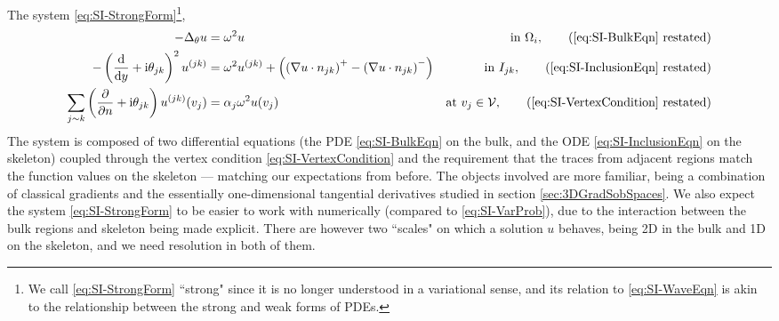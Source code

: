 The system \eqref{eq:SI-StrongForm}\footnote{We call \eqref{eq:SI-StrongForm} ``strong" since it is no longer understood in a variational sense, and its relation to \eqref{eq:SI-WaveEqn} is akin to the relationship between the strong and weak forms of PDEs.}, 
\begin{subequations}
	\begin{align*}
		-\laplacian_\qm u 
		&= \omega^2 u 
		&\text{in } \ddom_i, \tag{\eqref{eq:SI-BulkEqn} restated} \\
		- \bracs{\diff{}{y} + \rmi\qm_{jk}}^2u^{(jk)}  
		&= \omega^2 u^{(jk)} + \bracs{\bracs{\grad u\cdot n_{jk}}^+ - \bracs{\grad u\cdot n_{jk}}^-}
		&\text{in } I_{jk}, \tag{\eqref{eq:SI-InclusionEqn} restated} \\
		\sum_{j\con k} \bracs{\pdiff{}{n}+\rmi\qm_{jk}} u^{(jk)}(v_j) 
		&= \alpha_j\omega^2 u(v_j)
		&\text{at } v_j\in\vertSet, \tag{\eqref{eq:SI-VertexCondition} restated}
	\end{align*}
\end{subequations}
The system is composed of two differential equations (the PDE \eqref{eq:SI-BulkEqn} on the bulk, and the ODE \eqref{eq:SI-InclusionEqn} on the skeleton) coupled through the vertex condition \eqref{eq:SI-VertexCondition} and the requirement that the traces from adjacent regions match the function values on the skeleton --- matching our expectations from before.
The objects involved are more familiar, being a combination of classical gradients and the essentially one-dimensional tangential derivatives studied in section \ref{sec:3DGradSobSpaces}.
We also expect the system \eqref{eq:SI-StrongForm} to be easier to work with numerically (compared to \eqref{eq:SI-VarProb}), due to the interaction between the bulk regions and skeleton being made explicit.
There are however two ``scales" on which a solution $u$ behaves, being 2D in the bulk and 1D on the skeleton, and we need resolution in both of them.

